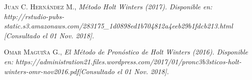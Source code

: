 \begin{thebibliography}{}
 \textsc{Juan C. Hernández M.},
\textit{Método Holt Winters (2017). Disponible en: http://rstudio-pubs-static.s3.amazonaws.com/283175\_1d0898ed1b704812a4eeb29b1fdcb213.html [Consultado el 01 Nov. 2018].}

 \textsc{Omar Maguiña G.},
\textit{El Método de Pronóstico de Holt Winters (2016). Disponible en: https://administration21.files.wordpress.com/2017/01/pronc3b3sticos-holt-winters-omr-nov2016.pdf[Consultado el 01 Nov. 2018].}

\end{thebibliography}